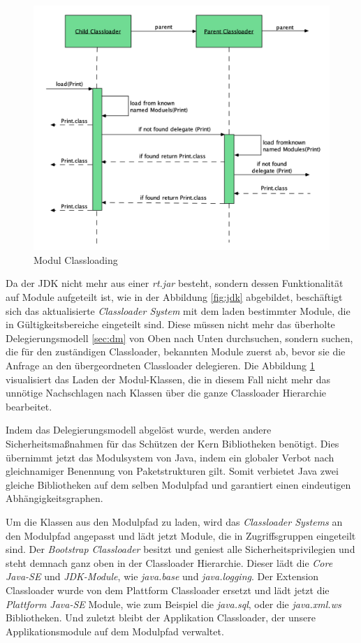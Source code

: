     \begin{figure}[h!]
      \centering{}
      \includegraphics[width=\textwidth]{material/images/module-classloading.png}
      \caption{Modul Classloading}
      \label{fig:mcl}
  \end{figure}

  Da der JDK nicht mehr aus einer \textit{rt.jar} besteht, sondern dessen Funktionalität auf Module aufgeteilt ist, wie in der Abbildung \ref{fig:jdk} abgebildet, beschäftigt sich das aktualisierte \textit{Classloader System} mit dem laden bestimmter Module, die in Gültigkeitsbereiche eingeteilt sind. Diese müssen nicht mehr das überholte Delegierungsmodell \ref{sec:dm} von Oben nach Unten durchsuchen, sondern suchen, die für den zuständigen Classloader, bekannten Module zuerst ab, bevor sie die Anfrage an den übergeordneten Classloader delegieren. Die Abbildung \ref{fig:mcl} visualisiert das Laden der Modul-Klassen, die in diesem Fall nicht mehr das unnötige Nachschlagen nach Klassen über die ganze Classloader Hierarchie bearbeitet.


  Indem das Delegierungsmodell abgelöst wurde, werden andere Sicherheitsmaßnahmen für das Schützen der Kern Bibliotheken benötigt. Dies übernimmt jetzt das Modulsystem von Java, indem ein globaler Verbot nach gleichnamiger Benennung von Paketstrukturen gilt. Somit verbietet Java zwei gleiche Bibliotheken auf dem selben Modulpfad und garantiert einen eindeutigen Abhängigkeitsgraphen. \bigbreak

  Um die Klassen aus den Modulpfad zu laden, wird das \textit{Classloader Systems} an den Modulpfad angepasst und lädt jetzt Module, die in Zugriffsgruppen eingeteilt sind. Der \textit{Bootstrap Classloader} besitzt und geniest alle Sicherheitsprivilegien und steht demnach ganz oben in der Classloader Hierarchie. Dieser lädt die \textit{Core Java-SE} und \textit{JDK-Module}, wie \textit{java.base} und \textit{java.logging}. Der Extension Classloader wurde von dem Plattform Classloader ersetzt und lädt jetzt die \textit{Plattform Java-SE} Module, wie zum Beispiel die \textit{java.sql}, oder die \textit{java.xml.ws} Bibliotheken. Und zuletzt bleibt der Applikation Classloader, der unsere Applikationsmodule auf dem Modulpfad verwaltet. 

